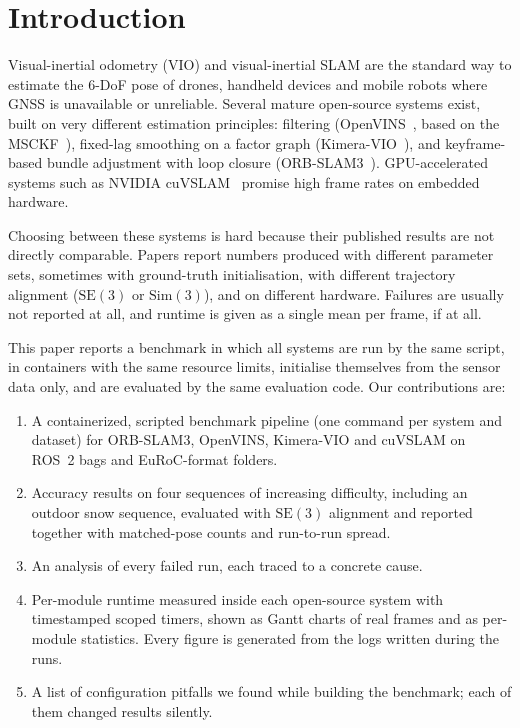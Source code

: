 \documentclass[conference,a4paper]{IEEEtran}
\newcommand{\SE}{$\mathrm{SE}(3)$}
\newcommand{\Sim}{$\mathrm{Sim}(3)$}
\begin{document}
\section{Introduction}

Visual-inertial odometry (VIO) and visual-inertial SLAM are the standard way to estimate the
6-DoF pose of drones, handheld devices and mobile robots where GNSS is unavailable or
unreliable. Several mature open-source systems exist, built on very different estimation
principles: filtering (OpenVINS~\cite{openvins}, based on the MSCKF~\cite{mourikis2007}),
fixed-lag smoothing on a factor graph (Kimera-VIO~\cite{kimeravio}), and keyframe-based bundle
adjustment with loop closure (ORB-SLAM3~\cite{orbslam3}). GPU-accelerated systems such as NVIDIA
cuVSLAM~\cite{cuvslam,korovko2025cuvslam} promise high frame rates on embedded hardware.

Choosing between these systems is hard because their published results are not directly
comparable. Papers report numbers produced with different parameter sets, sometimes with
ground-truth initialisation, with different trajectory alignment (\SE{} or \Sim{}), and on
different hardware. Failures are usually not reported at all, and runtime is given as a single
mean per frame, if at all.

This paper reports a benchmark in which all systems are run by the same script, in containers
with the same resource limits, initialise themselves from the sensor data only, and are
evaluated by the same evaluation code. Our contributions are:
\begin{enumerate}
  \item A containerized, scripted benchmark pipeline (one command per system and dataset) for
        ORB-SLAM3, OpenVINS, Kimera-VIO and cuVSLAM on ROS~2 bags and EuRoC-format folders.
  \item Accuracy results on four sequences of increasing difficulty, including an outdoor
        snow sequence, evaluated with \SE{} alignment and reported together with matched-pose
        counts and run-to-run spread.
  \item An analysis of every failed run, each traced to a concrete cause.
  \item Per-module runtime measured inside each open-source system with timestamped scoped
        timers, shown as Gantt charts of real frames and as per-module statistics. Every
        figure is generated from the logs written during the runs.
  \item A list of configuration pitfalls we found while building the benchmark; each of them
        changed results silently.
\end{enumerate}
\end{document}
